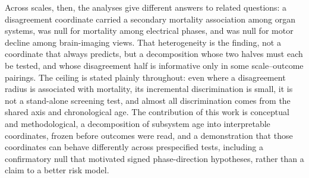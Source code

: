 \documentclass[11pt]{article}
\begin{document}
Across scales, then, the analyses give different answers to related questions: a disagreement
coordinate carried a secondary mortality association among organ systems, was null for
mortality among electrical phases, and was null for motor decline among brain-imaging
views. That heterogeneity is the finding, not a coordinate that always predicts, but a
decomposition whose two halves must each be tested, and whose disagreement half is
informative only in some scale--outcome pairings. The ceiling is stated plainly throughout: even where a disagreement
radius is associated with mortality, its incremental discrimination is small, it is not a
stand-alone screening test, and almost all discrimination comes from the shared axis and
chronological age. The contribution of this work is conceptual and methodological, a
decomposition of subsystem age into interpretable coordinates, frozen before outcomes
were read, and a demonstration that those coordinates can behave differently
across prespecified tests, including a confirmatory null that motivated signed
phase-direction hypotheses, rather
than a claim to a better risk model.
\end{document}
